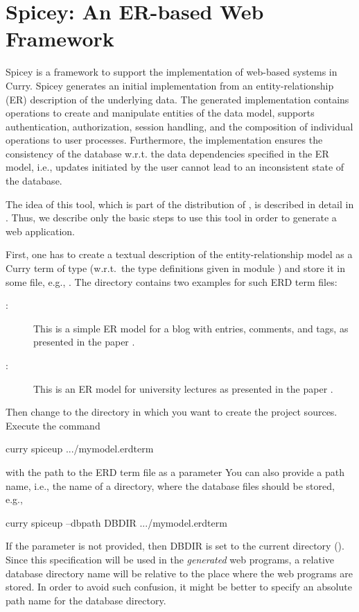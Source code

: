 \section{Spicey: An ER-based Web Framework}
\label{sec-spicey}

Spicey is a framework to support the implementation of
web-based systems in Curry. Spicey generates an initial implementation
from an entity-relationship (ER) description of the underlying
data. The generated implementation contains operations to create and
manipulate entities of the data model, supports authentication,
authorization, session handling, and the composition of individual
operations to user processes. Furthermore, the implementation ensures
the consistency of the database w.r.t. the data dependencies specified
in the ER model, i.e., updates initiated by the user cannot lead to an
inconsistent state of the database.

The idea of this tool, which is part of the distribution of \CYS,
is described in detail in \cite{HanusKoschnicke14TPLP}.
Thus, we describe only the basic steps to use this tool
in order to generate a web application.

First, one has to create a textual description of the
entity-relationship model
as a Curry term of type 
(w.r.t.\ the type definitions given in module
)
and store it in some file, e.g., .
The directory 
contains two examples for such ERD term files:
\begin{description}
\item[:]
This is a simple ER model for a blog with entries, comments,
and tags, as presented in the paper \cite{HanusKoschnicke14TPLP}.
\item[:]
This is an ER model for university lectures as
presented in the paper \cite{BrasselHanusMueller08PADL}.
\end{description}
%
Then change to the directory in which you want to create
the project sources.
Execute the command
\begin{curry}
curry spiceup .../mymodel.erdterm
\end{curry}
with the path to the ERD term file as a parameter
You can also provide a path name, i.e., the name of a directory,
where the database files should be stored, e.g.,
\begin{curry}
curry spiceup --dbpath DBDIR .../mymodel.erdterm
\end{curry}
If the parameter  is not provided,
then DBDIR is set to the current directory ().
Since this specification will be used in the \emph{generated} web programs,
a relative database directory name will be relative to the place where
the web programs are stored.
In order to avoid such confusion, it might be better to specify
an absolute path name for the database directory.


